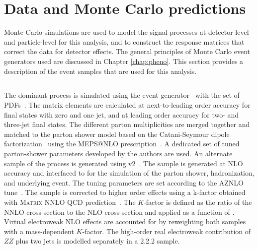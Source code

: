 \section{Data and Monte Carlo predictions}
\label{sec:montecarlopred}
Monte Carlo simulations are used to model the signal processes at detector-level and particle-level for this analysis, and to construct the response matrices that correct the data for detector effects. The general principles of Monte Carlo event generators used are discussed in Chapter \ref{chap:pheno}. This section provides a description of the event samples that are used for this analysis. 

\subsection{\qqFourL}
The dominant \qqFourL process is simulated using the  event generator~\cite{Bothmann:2019yzt} with the \nnpdfnnlo{} set of PDFs~\cite{Ball:2014uwa}. The matrix elements are calculated at next-to-leading order accuracy for final states with zero and one jet, and at leading order accuracy for two- and three-jet final states. The different parton multiplicities are merged together and matched to the \SHERPA parton shower model based on the Catani-Seymour dipole factorization~\cite{Gleisberg:2008fv,Schumann:2007mg} using the MEPS@NLO prescription~\cite{Hoeche:2011fd,Hoeche:2012yf,Catani:2001cc,Hoeche:2009r}. A dedicated set of tuned parton-shower parameters developed by the \SHERPA authors are used. 
An alternate sample of the \qqFourL process is generated using  \POWHEGBOX v2~\cite{Alioli:2010xd,Melia:2011tj,Nason:2013ydw}. The sample is generated at NLO accuracy and interfaced to  for the simulation of the parton shower, hadronization, and underlying event. The tuning parameters are set according to the AZNLO tune~\cite{STDM-2012-23}. The sample is corrected to higher order effects using a k-factor obtained with \textsc{Matrix} NNLO QCD prediction~\cite{Cascioli:2014yka,Grazzini:2015hta,Grazzini:2017mhc,Kallweit:2018nyv}. The $K$-factor is defined as the ratio of the NNLO cross-section to the NLO cross-section and applied as a function of \mFourL{}. 
Virtual electroweak NLO effects are accounted for by reweighting both samples with a mass-dependent $K$-factor. The high-order real electroweak contribution of $ZZ$ plus two jets is modelled separately in a \SHERPA{} {2.2.2} sample. 

